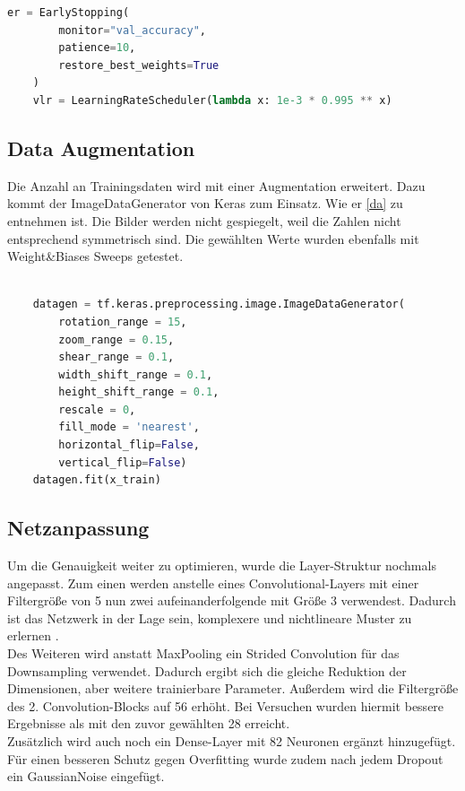\documentclass[
fontsize=12pt,					%
paper=a4,						%
twoside=false, 					%
listof=totoc, 					%
bibliography=totoc,				%
titlepage, 						%
headsepline, 					%
DIV=12,							%
BCOR=6mm,						%
cleardoublepage=empty,			%
parskip,							%
ngerman
]{scrartcl}
\begin{document}
\begin{lstlisting}[language=Python, caption=Callbacks, label=callback]
	er = EarlyStopping(
		monitor="val_accuracy",
		patience=10,
	    restore_best_weights=True
	)
	vlr = LearningRateScheduler(lambda x: 1e-3 * 0.995 ** x)
\end{lstlisting}

\subsection{Data Augmentation}

Die Anzahl an Trainingsdaten wird mit einer Augmentation erweitert. Dazu kommt der ImageDataGenerator von Keras zum Einsatz. Wie er \autoref{da} zu entnehmen ist. Die Bilder werden nicht gespiegelt, weil die Zahlen nicht entsprechend symmetrisch sind. Die gewählten Werte wurden ebenfalls mit Weight\&Biases Sweeps getestet.

\begin{lstlisting}[language=Python, caption=Data Augmentation, label=da]
	
	datagen = tf.keras.preprocessing.image.ImageDataGenerator(
		rotation_range = 15,
		zoom_range = 0.15,
		shear_range = 0.1,
		width_shift_range = 0.1,
		height_shift_range = 0.1,
		rescale = 0,
		fill_mode = 'nearest',
		horizontal_flip=False,
		vertical_flip=False)
	datagen.fit(x_train)

\end{lstlisting}

\subsection{Netzanpassung}

Um die Genauigkeit weiter zu optimieren, wurde die Layer-Struktur nochmals angepasst. Zum einen werden anstelle eines Convolutional-Layers mit einer Filtergröße von 5 nun zwei aufeinanderfolgende mit Größe 3 verwendest. Dadurch ist das Netzwerk in der Lage sein, komplexere und nichtlineare Muster zu erlernen \autocite{Riad.2022}.\\
Des Weiteren wird anstatt MaxPooling ein Strided Convolution für das Downsampling verwendet. Dadurch ergibt sich die gleiche Reduktion der Dimensionen, aber weitere trainierbare Parameter. Außerdem wird die Filtergröße des 2. Convolution-Blocks auf 56 erhöht. Bei Versuchen wurden hiermit bessere Ergebnisse als mit den zuvor gewählten 28 erreicht.\\
Zusätzlich wird auch noch ein Dense-Layer mit 82 Neuronen ergänzt hinzugefügt. Für einen besseren Schutz gegen Overfitting wurde zudem nach jedem Dropout ein GaussianNoise eingefügt.
\end{document}
